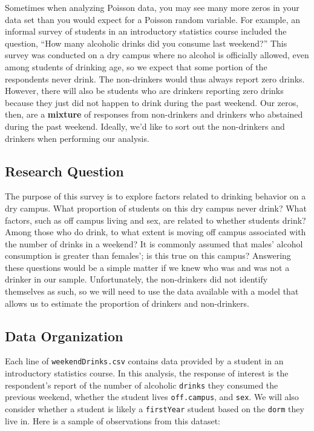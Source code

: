 \documentclass[
]{krantz}
\begin{document}
Sometimes when analyzing Poisson data, you may see many more zeros in your data set than you would expect for a Poisson random variable. For example, an informal survey of students in an introductory statistics course included the question, ``How many alcoholic drinks did you consume last weekend?'' This survey was conducted on a dry campus where no alcohol is officially allowed, even among students of drinking age, so we expect that some portion of the respondents never drink. The non-drinkers would thus always report zero drinks. However, there will also be students who are drinkers reporting zero drinks because they just did not happen to drink during the past weekend. Our zeros, then, are a \textbf{mixture} of responses from non-drinkers and drinkers who abstained during the past weekend. Ideally, we'd like to sort out the non-drinkers and drinkers when performing our analysis.

\hypertarget{research-question}{%
\subsection{Research Question}\label{research-question}}

The purpose of this survey is to explore factors related to drinking behavior on a dry campus. What proportion of students on this dry campus never drink? What factors, such as off campus living and sex, are related to whether students drink? Among those who do drink, to what extent is moving off campus associated with the number of drinks in a weekend? It is commonly assumed that males' alcohol consumption is greater than females'; is this true on this campus? Answering these questions would be a simple matter if we knew who was and was not a drinker in our sample. Unfortunately, the non-drinkers did not identify themselves as such, so we will need to use the data available with a model that allows us to estimate the proportion of drinkers and non-drinkers.

\hypertarget{data-organization-1}{%
\subsection{Data Organization}\label{data-organization-1}}

Each line of \texttt{weekendDrinks.csv} contains data provided by a student in an introductory statistics course. In this analysis, the response of interest is the respondent's report of the number of alcoholic \texttt{drinks} they consumed the previous weekend, whether the student lives \texttt{off.campus}, and \texttt{sex}. We will also consider whether a student is likely a \texttt{firstYear} student based on the \texttt{dorm} they live in. Here is a sample of observations from this dataset:
\end{document}
